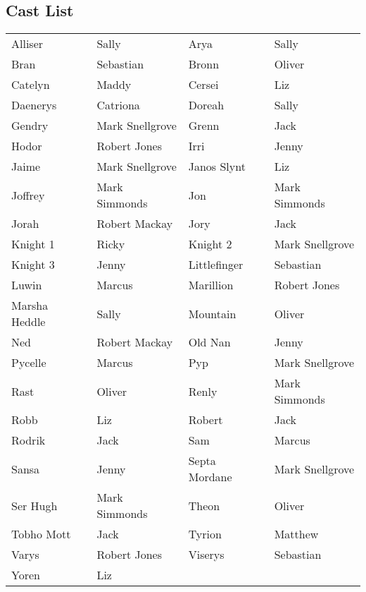 \subsection*{Cast List}
\begin{tabular}{ll|ll}\\
Alliser & Sally &  Arya & Sally\\
Bran & Sebastian &  Bronn & Oliver\\
Catelyn & Maddy &  Cersei & Liz\\
Daenerys & Catriona &  Doreah & Sally\\
Gendry & Mark Snellgrove &  Grenn & Jack\\
Hodor & Robert Jones &  Irri & Jenny\\
Jaime & Mark Snellgrove &  Janos Slynt & Liz\\
Joffrey & Mark Simmonds &  Jon & Mark Simmonds\\
Jorah & Robert Mackay &  Jory & Jack\\
Knight 1 & Ricky &  Knight 2 & Mark Snellgrove\\
Knight 3 & Jenny &  Littlefinger & Sebastian\\
Luwin & Marcus &  Marillion & Robert Jones\\
Marsha Heddle & Sally &  Mountain & Oliver\\
Ned & Robert Mackay &  Old Nan & Jenny\\
Pycelle & Marcus &  Pyp & Mark Snellgrove\\
Rast & Oliver &  Renly & Mark Simmonds\\
Robb & Liz &  Robert & Jack\\
Rodrik & Jack &  Sam & Marcus\\
Sansa & Jenny &  Septa Mordane & Mark Snellgrove\\
Ser Hugh & Mark Simmonds &  Theon & Oliver\\
Tobho Mott & Jack &  Tyrion & Matthew\\
Varys & Robert Jones &  Viserys & Sebastian\\
Yoren & Liz &  \end{tabular}
